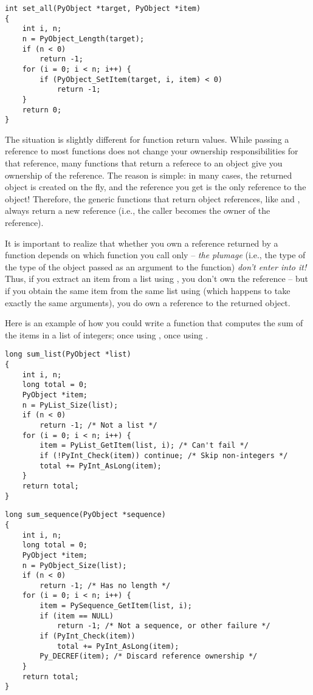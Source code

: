 \documentclass[twoside,openright]{report}
\begin{document}
\begin{verbatim}
int set_all(PyObject *target, PyObject *item)
{
    int i, n;
    n = PyObject_Length(target);
    if (n < 0)
        return -1;
    for (i = 0; i < n; i++) {
        if (PyObject_SetItem(target, i, item) < 0)
            return -1;
    }
    return 0;
}
\end{verbatim}

The situation is slightly different for function return values.  
While passing a reference to most functions does not change your 
ownership responsibilities for that reference, many functions that 
return a referece to an object give you ownership of the reference.
The reason is simple: in many cases, the returned object is created 
on the fly, and the reference you get is the only reference to the 
object!  Therefore, the generic functions that return object 
references, like  and 
, always return a new reference (i.e., the 
caller becomes the owner of the reference).

It is important to realize that whether you own a reference returned 
by a function depends on which function you call only -- \emph{the 
plumage} (i.e., the type of the type of the object passed as an 
argument to the function) \emph{don't enter into it!}  Thus, if you 
extract an item from a list using , you don't 
own the reference -- but if you obtain the same item from the same 
list using  (which happens to take exactly 
the same arguments), you do own a reference to the returned object.

Here is an example of how you could write a function that computes the 
sum of the items in a list of integers; once using 
, once using .

\begin{verbatim}
long sum_list(PyObject *list)
{
    int i, n;
    long total = 0;
    PyObject *item;
    n = PyList_Size(list);
    if (n < 0)
        return -1; /* Not a list */
    for (i = 0; i < n; i++) {
        item = PyList_GetItem(list, i); /* Can't fail */
        if (!PyInt_Check(item)) continue; /* Skip non-integers */
        total += PyInt_AsLong(item);
    }
    return total;
}
\end{verbatim}

\begin{verbatim}
long sum_sequence(PyObject *sequence)
{
    int i, n;
    long total = 0;
    PyObject *item;
    n = PyObject_Size(list);
    if (n < 0)
        return -1; /* Has no length */
    for (i = 0; i < n; i++) {
        item = PySequence_GetItem(list, i);
        if (item == NULL)
            return -1; /* Not a sequence, or other failure */
        if (PyInt_Check(item))
            total += PyInt_AsLong(item);
        Py_DECREF(item); /* Discard reference ownership */
    }
    return total;
}
\end{verbatim}
\end{document}
